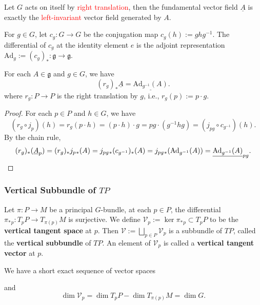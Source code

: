 \begin{example}
    Let $G$ acts on itself by \textcolor{red}{right translation}, 
    then the fundamental vector field $\underline{A}$ is exactly the \textcolor{red}{left-invariant} vector field generated by $A$.
\end{example}
For $g\in G$, let $c_g: G\to G$ be the conjugation map $c_g(h) := ghg^{-1}$. 
The differential of $c_g$ at the identity element $e$ is the adjoint representation 
$\mathrm{Ad}_g:=(c_g)_*: \mathfrak{g}\to\mathfrak{g}$. 
\begin{proposition}
    For each $A\in\mathfrak{g}$ and $g\in G$, we have 
    \begin{equation*}
        (r_g)_*\underline{A} = \underline{\mathrm{Ad}_{g^{-1}}(A)}.
    \end{equation*}
    where $r_g: P\to P$ is the right translation by $g$, i.e., $r_g(p) := p\cdot g$.
\end{proposition}
\begin{proof}
    For each $p\in P$ and $h\in G$, we have 
    \begin{equation*}
        (r_g\circ j_p)(h) = r_g(p\cdot h) = (p\cdot h)\cdot g = pg\cdot (g^{-1}hg) = (j_{pg}\circ c_{g^{-1}})(h).
    \end{equation*}
    By the chain rule, 
    \begin{equation*}
        (r_g)_*(\underline{A}_p) = (r_g)_*j_p{}_*(A) = j_{pg}{}_*(c_{g^{-1}})_*(A) 
        = j_{pg}{}_*(\mathrm{Ad}_{g^{-1}}(A))
        = \underline{\mathrm{Ad}_{g^{-1}}(A)}_{pg}.\qedhere
    \end{equation*}
\end{proof}


\subsubsection{Vertical Subbundle of $TP$}
Let $\pi: P\to M$ be a principal $G$-bundle, at each $p\in P$, the differential $\pi_*{}_p: T_pP\to T_{\pi(p)}M$ is 
surjective. We define $\mathcal{V}_p := \ker \pi_*{}_p\subset T_pP$ to be the \textbf{vertical tangent space} at $p$. 
Then $\mathcal{V} := \bigsqcup_{p\in P} \mathcal{V}_p$ is a subbundle of $TP$, called the \textbf{vertical subbundle} of $TP$. 
An element of $\mathcal{V}_p$ is called a \textbf{vertical tangent vector} at $p$. 

We have a short exact sequence of vector spaces
\begin{center}
\end{center}
and
\begin{equation*}
     \dim \mathcal{V}_p = \dim T_p P - \dim T_{\pi(p)} M = \dim G.
\end{equation*}

